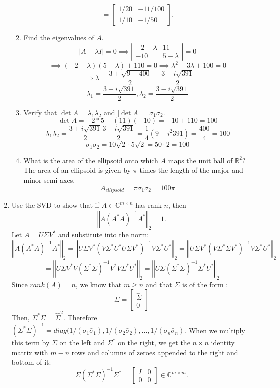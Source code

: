 \documentclass[12pt]{article}
\numberwithin{equation}{section}
\newcommand{\norm}[1]{\left\Vert#1\right\Vert}
\begin{document}
\begin{enumerate}
\begin{enumerate}
$$        =\left[\begin{array}{cc}1/20&-11/100\\1/10&-1/50\end{array}\right].$$
    \item Find the eigenvalues of $A$.
        $$|A-\lambda I|=0\implies \left|\begin{array}{cc}-2-\lambda&11\\-10&5-\lambda\end{array}\right|=0$$
        $$\implies(-2-\lambda)(5-\lambda)+110=0\implies\lambda^2-3\lambda+100=0$$
        $$\implies \lambda=\frac{3\pm\sqrt{9-400}}{2}=\frac{3\pm i\sqrt{391}}{2}$$
        $$\lambda_1=\frac{3+i\sqrt{391}}{2},\lambda_2=\frac{3-i\sqrt{391}}{2}$$
    \item Verify that $\det A=\lambda_1\lambda_2$ and $|\det A|=\sigma_1\sigma_2$.\\
        $$\det A=-2*5-(11)(-10)=-10+110=100$$
        $$\lambda_1\lambda_2=\frac{3+i\sqrt{391}}{2}\frac{3-i\sqrt{391}}{2}=\frac{1}{4}(9-i^2 391)=\frac{400}{4}=100$$
        $$\sigma_1\sigma_2=10\sqrt{2}\cdot5\sqrt{2}=50\cdot2=100$$
    \item What is the area of the ellipsoid onto which $A$ maps the unit ball of $\mathbb{R}^2$?\\
    The area of an ellipsoid is given by $\pi$ times the length of the major and minor semi-axes.
    $$A_{ellipsoid}=\pi\sigma_1\sigma_2=100\pi$$

    \end{enumerate}
\item Use the SVD to show that if $A\in\mathbb{C}^{m\times n}$ has rank $n$, then
$$\norm{A(A^*A)^{-1}A^*}_2=1.$$
Let $A=U\Sigma V^*$ and substitute into the norm:
$$\norm{A(A^*A)^{-1}A^*}_2=\norm{U\Sigma V^*(V\Sigma^*U^*U\Sigma V^*)^{-1}V\Sigma^*U^*}_2=\norm{U\Sigma V^*(V\Sigma^*\Sigma V^*)^{-1}V\Sigma^* U^*}_2$$
$$=\norm{U\Sigma V^*V(\Sigma^*\Sigma)^{-1}V^*V\Sigma^*U^*}_2=\norm{U\Sigma(\Sigma^*\Sigma)^{-1}\Sigma^*U^*}_2$$
Since $rank(A)=n$, we know that $m\geq n$ and that $\Sigma$ is of the form :
$$\Sigma=\left[\begin{array}{c}\hat{\Sigma}\\ \hline 0\end{array}\right]$$
Then, $\Sigma^*\Sigma=\hat{\Sigma}^2$. Therefore $(\Sigma^*\Sigma)^{-1}=diag(1/(\sigma_1\bar{\sigma}_1),1/(\sigma_2\bar{\sigma}_2),...,1/(\sigma_n\bar{\sigma}_n)$. When we multiply this term by $\Sigma$ on the left and $\Sigma^*$ on the right, we get the $n\times n$ identity matrix with $m-n$ rows and columns of zeroes appended to the right and bottom of it:
$$\Sigma(\Sigma^*\Sigma)^{-1}\Sigma^*=\left[\begin{array}{c|c}I& 0\\ \hline 0&0\end{array}\right]\in\mathbb{C}^{m\times m}.$$


\end{enumerate}
\end{document}
